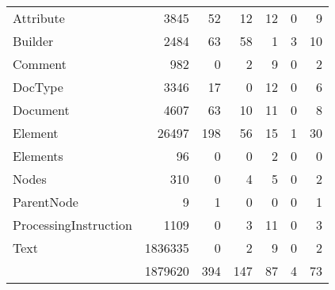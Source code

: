 \begin{tabular}{|l|r|r|r||r|r|r|}\hline
\typeHeading				& \successHeading & \failureHeading &\errorHeading &\successOnlyHeading	& \nonSuccessOnlyHeading 	& \mixedHeading\\\hline\hline
Attribute		& 3845	& 52	& 12	& 12	& 0	& 9\\\hline
Builder		& 2484	& 63	& 58	& 1	& 3	& 10\\\hline
Comment		& 982	& 0	& 2	& 9	& 0	& 2\\\hline
DocType		& 3346	& 17	& 0	& 12	& 0	& 6\\\hline
Document		& 4607	& 63	& 10	& 11	& 0	& 8\\\hline
Element		& 26497	& 198	& 56	& 15	& 1	& 30\\\hline
Elements		& 96	& 0	& 0	& 2	& 0	& 0\\\hline
Nodes		& 310	& 0	& 4	& 5	& 0	& 2\\\hline
ParentNode		& 9	& 1	& 0	& 0	& 0	& 1\\\hline
ProcessingInstruction		& 1109	& 0	& 3	& 11	& 0	& 3\\\hline
Text		& 1836335	& 0	& 2	& 9	& 0	& 2\\\hline
\hline
 & 1879620 & 394 & 147 & 87 & 4 & 73\\\hline
\end{tabular}
